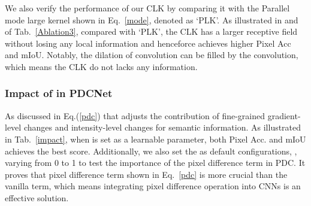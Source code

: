 \documentclass[lettersize,journal]{IEEEtran}
\begin{document}
We also verify the performance of our CLK by comparing it with the Parallel mode large kernel shown in Eq.~\ref{mode}, denoted as `PLK'. As illustrated in  and  of Tab.~\ref{Ablation3}, compared with `PLK', the CLK has a larger receptive field without losing any local information and henceforce achieves higher Pixel Acc and mIoU. Notably, the dilation of  convolution can be filled by the  convolution, which means the CLK do not lacks any information. 




\subsubsection{Impact of  in PDCNet} As discussed in Eq.(\ref{pdc}) that  adjusts the contribution of fine-grained gradient-level changes and intensity-level changes for semantic information. As illustrated in Tab.~\ref{impact}, when  is set as a learnable parameter, both Pixel Acc. and mIoU achieves the best score. Additionally, we also set
the  as default configurations, , varying from 0 to 1 to test the importance of the pixel difference term in PDC. It proves that pixel difference term shown in Eq.~\ref{pdc} is more crucial than the vanilla term, which means integrating pixel difference operation into CNNs is an effective solution. 






\begin{table}
\centering
\caption{Impact of  in PDCNet tested on NYUDv2 dataset under multi-scale testing.}
\label{nyud2}
\end{table}
\end{document}
